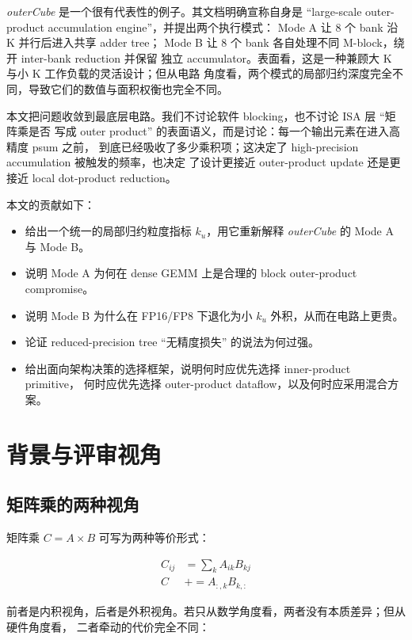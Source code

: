 \documentclass[UTF8,11pt,a4paper]{ctexart}
\newcommand{\ku}{\ensuremath{k_u}}
\newcommand{\modea}{Mode A}
\newcommand{\modeb}{Mode B}
\newcommand{\outercube}{\textit{outerCube}}
\begin{document}
\outercube{} 是一个很有代表性的例子。其文档明确宣称自身是
``large-scale outer-product accumulation engine''，并提出两个执行模式：
\modea{} 让 8 个 bank 沿 K 并行后进入共享 adder tree；
\modeb{} 让 8 个 bank 各自处理不同 M-block，绕开 inter-bank reduction 并保留
独立 accumulator。表面看，这是一种兼顾大 K 与小 K 工作负载的灵活设计；但从电路
角度看，两个模式的局部归约深度完全不同，导致它们的数值与面积权衡也完全不同。

本文把问题收敛到最底层电路。我们不讨论软件 blocking，也不讨论 ISA 层 ``矩阵乘是否
写成 outer product'' 的表面语义，而是讨论：每一个输出元素在进入高精度 psum 之前，
到底已经吸收了多少乘积项；这决定了 high-precision accumulation 被触发的频率，也决定
了设计更接近 outer-product update 还是更接近 local dot-product reduction。

本文的贡献如下：

\begin{itemize}
  \item 给出一个统一的局部归约粒度指标 $\ku$，用它重新解释 \outercube{} 的
  \modea{} 与 \modeb{}。
  \item 说明 \modea{} 为何在 dense GEMM 上是合理的 block outer-product compromise。
  \item 说明 \modeb{} 为什么在 FP16/FP8 下退化为小 $\ku$ 外积，从而在电路上更贵。
  \item 论证 reduced-precision tree ``无精度损失'' 的说法为何过强。
  \item 给出面向架构决策的选择框架，说明何时应优先选择 inner-product primitive，
  何时应优先选择 outer-product dataflow，以及何时应采用混合方案。
\end{itemize}

\section{背景与评审视角}

\subsection{矩阵乘的两种视角}

矩阵乘 $C = A \times B$ 可写为两种等价形式：

\begin{align}
  C_{ij} &= \sum_k A_{ik} B_{kj} \\
  C &\mathrel{+}= A_{:,k} B_{k,:}
\end{align}

前者是内积视角，后者是外积视角。若只从数学角度看，两者没有本质差异；但从硬件角度看，
二者牵动的代价完全不同：
\end{document}
